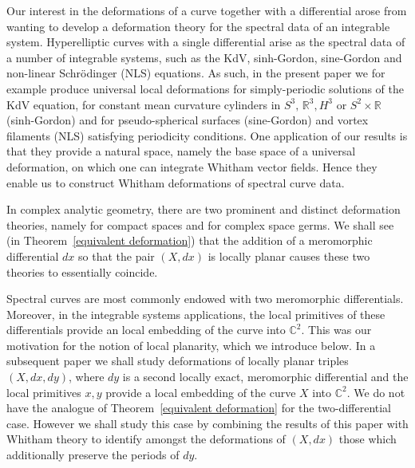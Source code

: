 \documentclass[11pt,twoside]{amsart}
\theoremstyle{plain}
\newcommand{\dfx}{dx}
\newcommand{\dfy}{dy}
\begin{document}
Our interest in the deformations of a curve together with a differential arose from wanting to develop a deformation theory for the spectral data of an integrable system. Hyperelliptic curves with a single differential arise as the spectral data of a number of integrable systems, such as the KdV, sinh-Gordon, sine-Gordon and non-linear Schr\"{o}dinger (NLS) equations. As such, in the present paper we for example produce universal local deformations for simply-periodic solutions of the KdV equation, for constant mean curvature cylinders in $S ^ 3,\,\mathbb R ^ 3, H ^ 3 $ or $  S ^ 2\times\mathbb R $ (sinh-Gordon) and for pseudo-spherical surfaces (sine-Gordon) and vortex filaments (NLS) satisfying periodicity conditions. %
One application of our results is that they provide a natural space, namely the base space of a universal deformation, on which  one can  integrate Whitham vector fields. Hence they enable us to construct Whitham deformations of spectral curve data.

In complex analytic geometry, there are two prominent and distinct deformation theories, namely for compact spaces and for complex space germs. We shall see (in Theorem~\ref {equivalent deformation}) that the addition of a meromorphic differential $dx$ so that the pair $(X,dx)$ is locally planar causes these two theories to essentially coincide.


Spectral curves are most commonly endowed with two  meromorphic differentials. Moreover, in the integrable systems applications, the local primitives of these differentials provide an local embedding of the curve into $\mathbb{C}^2$. This was our motivation for the notion of local planarity, which we introduce below. In a subsequent paper we shall study deformations of locally planar triples $ (X, \dfx, \dfy) $, where $\dfy$ is a second locally exact, meromorphic differential and the local primitives $x,y$ provide a local embedding of the curve $X$ into $\mathbb{C}^2$. We do not have the analogue of Theorem~\ref {equivalent deformation} for the two-differential case. However we shall study this case by combining the results of this paper with Whitham theory to identify amongst the deformations of $ (X,\dfx) $ those which additionally preserve the periods of $\dfy$. 


\end{document}
